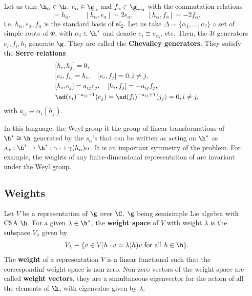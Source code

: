 \documentclass{worksheetclass}
\renewcommand{\emph}{\textbf}
\begin{document}
        Let us take $\h_\alpha\in\h$, $e_\alpha\in\g_\alpha$ and $f_\alpha\in\g_{-\alpha}$ with the commutation relations
        \begin{equation}
            [e_\alpha,f_\alpha]=h_\alpha,\qquad [h_\alpha,e_\alpha]=2e_\alpha,\qquad [h_\alpha,f_\alpha]=-2f_\alpha,
        \end{equation}
        i.e. $h_\alpha,e_\alpha,f_\alpha$ is the standard basis of $\mathfrak{sl}_2$. Let us take $\Delta=\{\alpha_1,\dots,\alpha_l\}$ a set of simple roots of $\Phi$, with $\alpha_i\in\h^*$ and denote $e_i\equiv e_{\alpha_i}$, etc. Then, the $3l$ generators $e_i,f_i,h_i$ generate $\g$. They are called the \emph{Chevalley generators}. They satisfy the \emph{Serre relations}
        \begin{align}
            &[h_i,h_j] = 0,\\
            &[e_i,f_i] = h_i,\quad [e_i,f_j]=0, i\neq j,\\
            &[h_i,e_j] = a_{ij}e_j,\quad [h_i,f_j]=-a_{ij}f_j,\\
            &\ad(e_i)^{-a_{ij}+1}(e_j) = \ad(f_i)^{-a_{ij}+1}(j_j)=0,i\neq j,
        \end{align}
        with $a_{ij}\equiv\alpha_i(h_j)$.

        In this language, the Weyl group it the group of linear transformations of $\h^*\cong\h$ generated by the $s_\alpha$'s that can be written as acting on $\h^*$ as $s_\alpha:\h^*\to\h^*:\gamma\mapsto\gamma(h_\alpha)\alpha$. It is an important symmetry of the problem. For example, the weights of any finite-dimensional representation of are invariant under the Weyl group.

    \subsection{Weights}

        Let $V$ be a representation of $\g$ over $\C$, $\g$ being semisimple Lie algebra with CSA $\h$. For a given $\lambda\in\h^*$, the \emph{weight space} of $V$ with weight $\lambda$ is the subspace $V_\lambda$ given by
        \begin{equation}
            V_\lambda\equiv \{v\in V| h\cdot v =\lambda(h)v\text{ for all }h\in\h\}.
        \end{equation}
        The \emph{weight} of a representation $V$ is a linear functional such that the correspondinf weight space is non-zero. Non-zero vectors of the weight space are called \emph{weight vectors}, they are a simultaneous eigenvector for the action of all the elements of $\h$, with eigenvalue given by $\lambda$. 

\printbibliography
\end{document}
